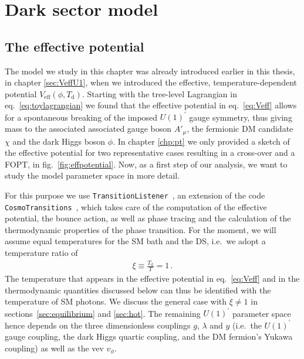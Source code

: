 \section{Dark sector model}
\label{sec:model}

\subsection{The effective potential}

The model we study in this chapter was already introduced earlier in this thesis, in chapter \ref{sec:VeffU1}, when we introduced the effective, temperature-dependent potential $V_\text{eff}(\phi, T_\text{d})$. Starting with the tree-level Lagrangian in eq.~\eqref{eq:toylagrangian} we found that the effective potential in eq.~\eqref{eq:Veff} allows for a spontaneous breaking of the imposed $U(1)^\prime$ gauge symmetry, thus giving mass to the associated associated gauge boson $A'_\mu$, the fermionic \ac{DM} candidate $\chi$ and the dark Higgs boson $\phi$. In chapter \ref{chp:pt} we only provided a sketch of the effective potential for two representative cases resulting in a cross-over and a \ac{FOPT}, in fig.~\ref{fig:effpotential}. Now, as a first step of our analysis, we want to study the model parameter space in more detail.

For this purpose we use \texttt{TransitionListener}~\cite{Ertas:2021xeh}, an extension of the code \texttt{CosmoTransitions}~\cite{Wainwright:2011kj}, which takes care of the computation of the effective potential, the bounce action, as well as phase tracing and the calculation of the thermodynamic properties of the phase transition. For the moment, we will assume equal temperatures for the \ac{SM} bath and the \ac{DS}, i.e.~we adopt a temperature ratio of 
\begin{align}
	\xi \equiv \frac{T_\text{d}}{T} =1 \, .
\end{align}
The temperature that appears in the effective potential in eq.~\eqref{eq:Veff} and in the thermodynamic quantities discussed below can thus be identified with the  temperature of \ac{SM} photons. We discuss the general case with $\xi \neq 1$ in sections~\ref{sec:equilibrium} and \ref{sec:hot}. The remaining $U(1)^\prime$ parameter space hence depends on the three dimensionless couplings $g$, $\lambda$ and $y$ (i.e.~the $U(1)^\prime$ gauge coupling, the dark Higgs quartic coupling, and the \ac{DM} fermion's Yukawa coupling) as well as the \ac{vev} $v_\phi$.

